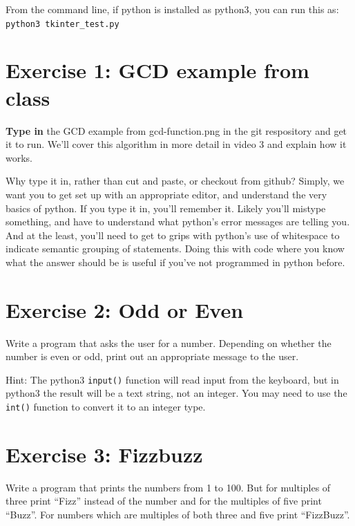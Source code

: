 \documentclass{article}
\begin{document}
\vspace{0.1in}\noindent From the command line, if python is installed as python3, you can run this as:\\
\texttt{python3 tkinter\_test.py}

\section*{Exercise 1: GCD example from class}

\textbf{Type in} the GCD example from gcd-function.png in the git
respository and get it to run.  We'll cover this algorithm in more
detail in video 3 and explain how it works.

\vspace{0.1in} Why type it in, rather than cut and paste, or checkout
from github?  Simply, we want you to get set up with an appropriate
editor, and understand the very basics of python. If you type it in,
you'll remember it.  Likely you'll mistype something, and have to
understand what python's error messages are telling you.  And at the
least, you'll need to get to grips with python's use of whitespace to
indicate semantic grouping of statements.  Doing this with code where
you know what the answer should be is useful if you've not programmed
in python before.

\section*{Exercise 2: Odd or Even}

Write a program that asks the user for a number. Depending on whether
the number is even or odd, print out an appropriate message to the
user.

\vspace{0.1in}\noindent Hint: The python3 \texttt{input()} function will read input from the keyboard,
but in python3 the result will be a text string, not an integer.  You
may need to use the \texttt{int()} function to convert it to an integer type.

\section*{Exercise 3: Fizzbuzz}

Write a program that prints the numbers from 1 to 100. But for
multiples of three print ``Fizz'' instead of the number and for the
multiples of five print ``Buzz''. For numbers which are multiples of
both three and five print ``FizzBuzz''.
\end{document}
